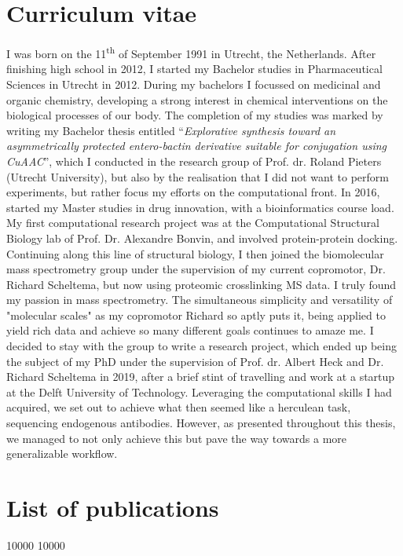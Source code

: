 \section{Curriculum vitae}
I was born on the 11\textsuperscript{th} of September 1991 in Utrecht, the Netherlands. After finishing high school in 2012, I started my Bachelor studies in Pharmaceutical Sciences in Utrecht in 2012. During my bachelors I focussed on medicinal and organic chemistry, developing a strong interest in chemical interventions on the biological processes of our body. The completion of my studies was marked by writing my Bachelor thesis entitled “\emph{Explorative synthesis toward an asymmetrically protected entero-bactin derivative suitable for conjugation using CuAAC}”, which I conducted in the research group of Prof. dr. Roland Pieters (Utrecht University), but also by the realisation that I did not want to perform experiments, but rather focus my efforts on the computational front. In 2016, started my Master studies in drug innovation, with a bioinformatics course load. My first computational research project was at the Computational Structural Biology lab of Prof. Dr. Alexandre Bonvin, and involved protein-protein docking. Continuing along this line of structural biology, I then joined the biomolecular mass spectrometry group under the supervision of my current copromotor, Dr. Richard Scheltema, but now using proteomic crosslinking MS data. I truly found my passion in mass spectrometry. The simultaneous simplicity and versatility of "molecular scales" as my copromotor Richard so aptly puts it, being applied to yield rich data and achieve so many different goals continues to amaze me. I decided to stay with the group to write a research project, which ended up being the subject of my PhD under the supervision of Prof. dr. Albert Heck and Dr. Richard Scheltema in 2019, after a brief stint of travelling and work at a startup at the Delft University of Technology. Leveraging the computational skills I had acquired, we set out to achieve what then seemed like a herculean task, sequencing endogenous antibodies. However, as presented throughout this thesis, we managed to not only achieve this but pave the way towards a more generalizable workflow.
\clearpage
\section{List of publications}
\nocite{*}

\patchcmd{\thebibliography}
{}
{ 10000  10000 }
{}{}

\clearpage
